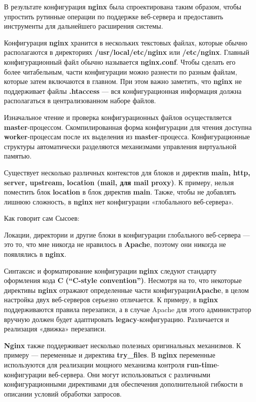 \documentclass[14pt, a4paper]{article}
\begin{document}
В результате конфигурация \textbf{nginx} была спроектирована таким образом, чтобы упростить рутинные 
операции по поддержке веб-сервера и предоставить инструменты для дальнейшего расширения системы.

Конфигурация \textbf{nginx} хранится в нескольких текстовых файлах, которые обычно располагаются в 
директориях \textbf{/usr/local/etc/nginx} или \textbf{/etc/nginx}. Главный конфигурационный файл обычно называется \linebreak
\textbf{nginx.conf}. Чтобы сделать его более читабельным, части конфигурации можно разнести по разным файлам, 
которые затем включаются в главном. При этом важно заметить, что \textbf{nginx} не поддерживает файлы 
\textbf{.htaccess} — вся конфигурационная информация должна располагаться в централизованном наборе файлов.

Изначальное чтение и проверка конфигурационных файлов осуществляется \textbf{master}-процессом. 
Скомпилированная форма конфигурации для чтения доступна \textbf{worker}-процессам после их выделения 
из \textbf{master}-процесса. Конфигурационные структуры автоматически разделяются механизмами управления виртуальной памятью.

Существует несколько различных контекстов для блоков и директив \textbf{main, http, server, 
upstream, location (mail, для mail proxy)}. К примеру, нельзя поместить блок \textbf{location} в 
блок директив \textbf{main}. Также, чтобы не добавлять лишнюю сложность, в \textbf{nginx} 
нет конфигурации «глобального веб-сервера». 

Как говорит сам Сысоев:

Локации, директории и другие блоки в конфигурации глобального веб-сервера — это то, 
что мне никогда не нравилось в \textbf{Apache}, поэтому они никогда не появлялись в \textbf{nginx}.

Синтаксис и форматирование конфигурации \textbf{nginx} следуют стандарту оформления кода \textbf{C} 
\textbf{(“C-style convention”)}. 
Несмотря на то, что некоторые директивы \textbf{nginx} отражают определенные части конфигурации\linebreak \textbf{Apache}, 
в целом настройка двух веб-серверов серьезно отличается. К примеру, в \textbf{nginx} поддерживаются 
правила перезаписи, а в случае Apache для этого администратор вручную должен будет адаптировать 
\textbf{legacy}-конфигурацию. Различается и реализация «движка» перезаписи.

\textbf{Nginx} также поддерживает несколько полезных оригинальных механизмов. К примеру — переменные 
и директива \textbf{try\_files}. В \textbf{nginx} переменные используются для реализации мощного механизма 
контроля \textbf{run-time}-конфигурации веб-сервера. Они могут использоваться с различными 
конфигурационными директивами для обеспечения дополнительной гибкости в описании условий обработки запросов.
\end{document}
